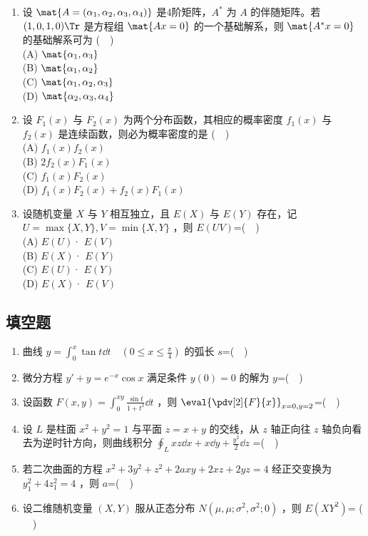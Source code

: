 \begin{enumerate}
(D) $\mat {P_2P_1^{-1}}$
\item  设 $\mat{A=(\alpha_1,\alpha_2,\alpha_3,\alpha_4)}$ 是4阶矩阵，$A^*$  为 $A$ 的伴随矩阵。若 $(1,0,1,0) \Tr$ 是方程组 $\mat {Ax=0}$ 的一个基础解系，则 $\mat {A^*x=0}$ 的基础解系可为 ($\quad$)\\
(A) $\mat {\alpha_1,\alpha_3}$\\
(B) $\mat {\alpha_1,\alpha_2}$\\
(C) $\mat {\alpha_1,\alpha_2,\alpha_3}$\\
(D) $\mat {\alpha_2,\alpha_3,\alpha_4}$
\item  设 $F_1(x)$ 与 $F_2(x)$ 为两个分布函数，其相应的概率密度 $f_1(x)$ 与 $f_2(x)$ 是连续函数，则必为概率密度的是 ($\quad$)\\
(A) $f_1(x)f_2(x)$\\
(B)  $2f_2(x)F_1(x)$\\
(C) $f_1(x)F_2(x)$\\
(D) $f_1(x)F_2(x)+f_2(x)F_1(x)$
\item 设随机变量 $X$ 与 $Y$ 相互独立，且 $E(X)$ 与 $E(Y)$ 存在，记 $U=\max \{X,Y\},V=\min \{X,Y\}$ ，则 $E(UV)$=($\quad$)\\
(A) $E(U)$· $E(V)$\\
(B)  $E(X)$· $E(Y)$\\
(C) $E(U)$· $E(Y)$\\
(D) $E(X)$· $E(V)$\\
\end{enumerate}
\subsection{填空题}
\begin{enumerate}
\item 曲线 $\displaystyle y=\int_{0}^{x} \tan t\dd{t} \quad (0 \le x \le \frac{\pi}{4})$  的弧长 $s$=($\quad$) 
\item 微分方程 $y'+y=e^{-x}\cos x$ 满足条件 $y(0)=0$  的解为 $y$=($\quad$) 
\item  设函数 $\displaystyle F(x,y)=\int_0^{xy} \frac{\sin t}{1+t^2}\dd{t}$ ，则 $\displaystyle {\eval{ \pdv[2]{F}{x}}_{x=0,y=2}}$=($\quad$)
\item  设 $L$ 是柱面 $x^2+y^2=1$ 与平面 $z=x+y$ 的交线，从 $z$ 轴正向往 $z$ 轴负向看去为逆时针方向，则曲线积分 $\displaystyle \oint_L xz\dd{x}+x\dd{y}+\frac{y^2}{2}\dd{z}$ =($\quad$)
\item  若二次曲面的方程  $x^2+3y^2+z^2+2axy+2xz+2yz=4$ 经正交变换为 $y_1^2+4z_1^2=4$ ，则 $a$=($\quad$)
\item  设二维随机变量 $(X,Y)$ 服从正态分布 $N(\mu,\mu;\sigma^2,\sigma^2;0)$ ，则 $E(XY^2)$= ($\quad$)
\end{enumerate}

